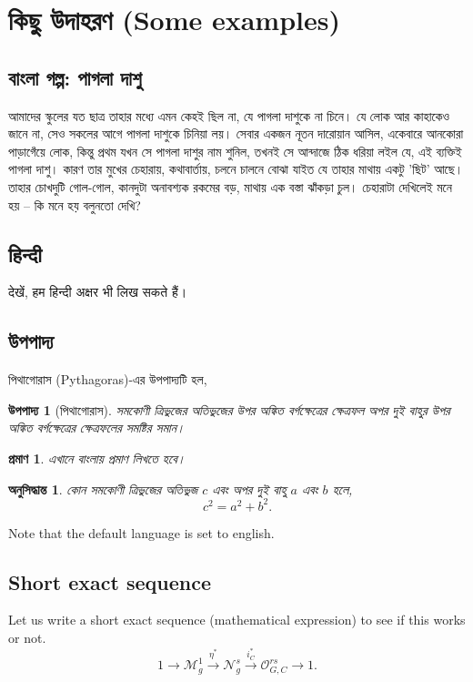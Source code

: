 \documentclass[12pt,reqno]{article}
\newcommand{\xra}[2][d]{\overset{#2}{\longrightarrow}}
\newcommand\bngn {\textbengali} %
\newcommand\bng {\fontsize{11}{12}\textbengali} %
\newcommand\eng {\textenglish}
\newcommand\hnd {\textsanskrit}
\theoremstyle{plain}
\newtheorem{bngthm}[theorem]{\bng{উপপাদ্য}}
\newtheorem{bngcor}[theorem]{\bng{অনুসিদ্ধান্ত}}
\newtheorem*{bngproof}{\bng{প্রমাণ}}
\numberwithin{equation}{section}
\begin{document}
\section{\bngn{কিছু উদাহরণ} (Some examples)}
\subsection{\bngn{বাংলা গল্প: পাগলা দাশু}}
\bng{আমাদের স্কুলের যত ছাত্র তাহার মধ্যে এমন কেহই ছিল না, যে পাগলা দাশুকে না চিনে। যে লোক আর কাহাকেও জানে না, সেও সকলের আগে পাগলা দাশুকে চিনিয়া লয়। সেবার একজন নূতন দারোয়ান আসিল, একেবারে আনকোরা পাড়াগেঁয়ে লোক, কিন্তু প্রথম যখন সে পাগলা দাশুর নাম শুনিল, তখনই সে আন্দাজে ঠিক ধরিয়া লইল যে, এই ব্যক্তিই পাগলা দাশু। কারণ তার মুখের চেহারায়, কথাবার্তায়, চলনে চালনে বোঝা যাইত যে তাহার মাথায় একটু 'ছিট' আছে। তাহার চোখদুটি গোল-গোল, কানদুটা অনাবশ্যক রকমের বড়, মাথায় এক বস্তা ঝাঁকড়া চুল। চেহারাটা দেখিলেই মনে হয় -- কি মনে হয় বলুনতো দেখি?}

\subsection{\hnd{हिन्दी}}
\hnd{देखें, हम हिन्दी अक्षर भी लिख सकते हैं।}
\subsection{\bngn{উপপাদ্য}} \bng{পিথাগোরাস (\eng{Pythagoras})-এর উপপাদ্যটি হল,}
\begin{bngthm}[\textbengali{পিথাগোরাস}]
  \textbengali{সমকোণী ত্রিভুজের অতিভুজের উপর অঙ্কিত  বর্গক্ষেত্রের ক্ষেত্রফল অপর দুই বাহুর উপর অঙ্কিত বর্গক্ষেত্রের ক্ষেত্রফলের সমষ্টির সমান।}
\end{bngthm}

\begin{bngproof}
 \bng{এখানে বাংলায় প্রমাণ লিখতে হবে।}
\end{bngproof}

\begin{bngcor}
 \textbengali{কোন সমকোণী ত্রিভুজের অতিভুজ $c$ এবং অপর দুই বাহু $a$ এবং $b$ হলে,}
  \[
    c^2=a^2+b^2.
  \]
\end{bngcor}


\noindent
Note that the default language is set to english.

\subsection{Short exact sequence}
Let us write a short exact sequence (mathematical expression) to see if this works or not.
\begin{equation}\label{extseq}
 1 \longrightarrow \mathscr{M}_g^1 \xra[]{\eta^*} \mathcal{N}_g^{s} \xra[]{i_C^*} \mathscr{O}_{G,C}^{rs} \longrightarrow 1.
\end{equation}
\end{document}
